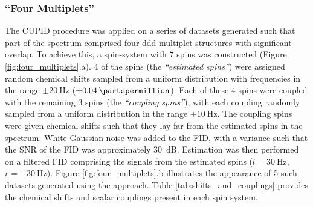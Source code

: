 \subsubsection{``Four Multiplets''}
The CUPID procedure was applied on a series of datasets generated
such that part of the spectrum comprised four ddd multiplet structures with
significant overlap. To achieve this, a spin-system with 7 spins was
constructed (Figure \ref{fig:four_multiplets}.a). 4 of the spins (the
\emph{``estimated spins''}) were assigned random chemical shifts sampled from a
uniform distribution with frequencies in the range $\pm \qty{20}{\hertz}$ ($\pm
\qty{0.04}{\partspermillion}$).  Each of these 4 spins were coupled with the
remaining 3 spins (the \emph{``coupling spins''}), with each coupling randomly
sampled from a uniform distribution in the range $\pm\qty{10}{\hertz}$.
The coupling spins were given chemical shifts such that they lay far from the
estimated spins in the spectrum. White Gaussian noise was added to the
FID, with a variance such that the SNR of the FID was approximately
\qty{30}{\deci\bel}.  Estimation was then performed on a filtered FID
comprising the signals from the estimated spins ($l = \qty{30}{\hertz}$, $r =
\qty{-30}{\hertz}$). Figure \ref{fig:four_multiplets}.b illustrates the
appearance of 5 such datasets generated using the approach. Table
\ref{tab:shifts_and_couplings} provides the chemical shifts and scalar
couplings present in each spin system.

